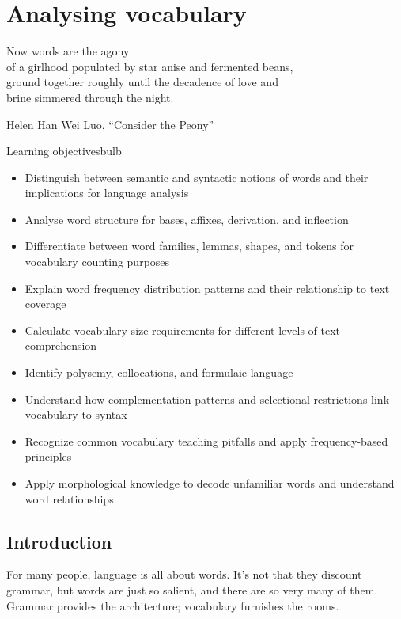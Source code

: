 \chapter{Analysing vocabulary} \label{ch:vocabulary}

\epigraph{Now words are the agony\\
of a girlhood populated by star anise and fermented beans,\\
ground together roughly until the decadence of love and\\
brine simmered through the night.}{Helen Han Wei Luo, \enquote{Consider the Peony}}

\begin{tblsframedsymbol}{Learning objectives}{bulb}
\begin{itemize}[noitemsep, leftmargin=*]
    \item Distinguish between semantic and syntactic notions of words and their implications for language analysis
    \item Analyse word structure for bases, affixes, derivation, and inflection
    \item Differentiate between word families, lemmas, shapes, and tokens for vocabulary counting purposes
    \item Explain word frequency distribution patterns and their relationship to text coverage
    \item Calculate vocabulary size requirements for different levels of text comprehension
    \item Identify polysemy, collocations, and formulaic language
    \item Understand how complementation patterns and selectional restrictions link vocabulary to syntax
    \item Recognize common vocabulary teaching pitfalls and apply frequency-based principles
    \item Apply morphological knowledge to decode unfamiliar words and understand word relationships
\end{itemize}
\end{tblsframedsymbol}

\section{Introduction}

For many people, language is all about words. It's not that they discount grammar, but words are just so salient, and there are so very many of them. Grammar provides the architecture; vocabulary furnishes the rooms.

